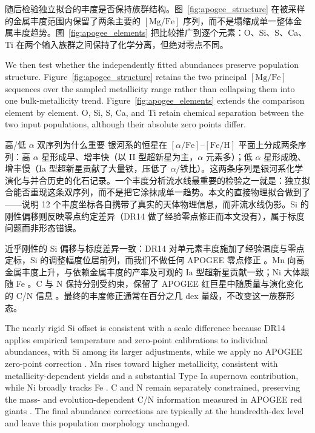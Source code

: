 随后检验独立拟合的丰度是否保持族群结构。图~\ref{fig:apogee_structure} 在被采样的金属丰度范围内保留了两条主要的 $[\mathrm{Mg}/\mathrm{Fe}]$ 序列，而不是塌缩成单一整体金属丰度趋势。图~\ref{fig:apogee_elements} 把比较推广到逐个元素：O、Si、S、Ca、Ti 在两个输入族群之间保持了化学分离，但绝对零点不同。

\begin{EN}
We then test whether the independently fitted abundances preserve population
structure. Figure~\ref{fig:apogee_structure} retains the two principal
$[\mathrm{Mg}/\mathrm{Fe}]$ sequences over the sampled metallicity range rather
than collapsing them into one bulk-metallicity trend. Figure~\ref{fig:apogee_elements}
extends the comparison element by element. O, Si, S, Ca, and Ti retain chemical
separation between the two input populations, although their absolute zero
points differ.
\end{EN}

\begin{physbox}{高/低 $\alpha$ 双序列为什么重要}
银河系的恒星在 $[\alpha/\mathrm{Fe}]$--$[\mathrm{Fe}/\mathrm{H}]$ 平面上分成两条序列：高 $\alpha$ 星形成早、增丰快（以 II 型超新星为主，$\alpha$ 元素多）；低 $\alpha$ 星形成晚、增丰慢（Ia 型超新星贡献了大量铁，压低了 $\alpha/$铁比）。这两条序列是银河系化学演化与并合历史的化石记录。一个丰度分析流水线最重要的检验之一就是：独立拟合能否重现这条双序列，而不是把它涂抹成单一趋势。本文的直接物理拟合做到了——说明 12 个丰度坐标各自携带了真实的天体物理信息，而非流水线伪影。Si 的刚性偏移则反映零点约定差异（DR14 做了经验零点修正而本文没有），属于标度问题而非形态错误。
\end{physbox}

近乎刚性的 Si 偏移与标度差异一致：DR14 对单元素丰度施加了经验温度与零点定标，Si 的调整幅度位居前列，而我们不做任何 APOGEE 零点修正 \citep{Holtzman2018}。Mn 向高金属丰度上升，与依赖金属丰度的产率及可观的 Ia 型超新星贡献一致；Ni 大体跟随 Fe \citep{Weinberg2019}。C 与 N 保持分别受约束，保留了 APOGEE 红巨星中随质量与演化变化的 C/N 信息 \citep{CharbonnelLagarde2010,Masseron2015,Martig2016}。最终的丰度修正通常在百分之几 dex 量级，不改变这一族群形态。

\begin{EN}
The nearly rigid Si offset is consistent with a scale difference because DR14 applies empirical
temperature and zero-point calibrations to individual abundances, with Si
among its larger adjustments, while we apply no APOGEE zero-point correction
\citep{Holtzman2018}. Mn rises toward higher metallicity, consistent with
metallicity-dependent yields and a
substantial Type Ia supernova contribution, while Ni broadly tracks Fe
\citep{Weinberg2019}. C and N remain separately constrained, preserving the
mass- and evolution-dependent C/N information measured in APOGEE red giants
\citep{CharbonnelLagarde2010,Masseron2015,Martig2016}. The final
abundance corrections are typically at the hundredth-dex level and leave this
population morphology unchanged.
\end{EN}

